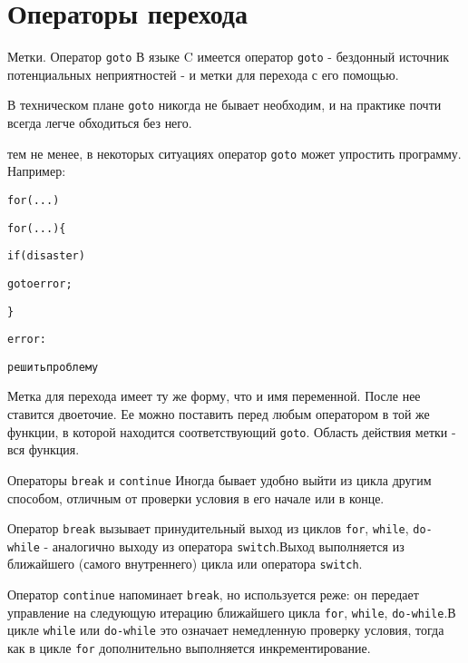 \documentclass[xcolor=table]{beamer}
\begin{document}
\section{Операторы перехода}

\begin{frame}{Метки. Оператор \texttt{goto}}
    В языке C имеется оператор \texttt{goto} - бездонный источник потенциальных неприятностей - и метки для перехода с его помощью.
    
    В техническом плане \texttt{goto} никогда не бывает необходим, и на практике почти всегда легче обходиться без него.
    
    тем не менее, в некоторых ситуациях оператор \texttt{goto} может упростить программу. Например:
    \begin{alltt}
        for ( ... )
        
        \qquad for ( ... ) \{
                
        \qquad \qquad if (disaster)
                
        \qquad \qquad \qquad goto error;
            
            \}
    
    error:
    
    \qquad решить проблему
    \end{alltt}
    Метка для перехода имеет ту же форму, что и имя переменной. После нее ставится двоеточие. Ее можно поставить перед любым оператором в той же функции, в которой находится соответствующий \texttt{goto}. Область действия метки - вся функция.
\end{frame}

\begin{frame}{Операторы \texttt{break} и \texttt{continue}}
    Иногда бывает удобно выйти из цикла другим способом, отличным от проверки условия в его начале или в конце.
    
    \medskip
    Оператор \texttt{break} вызывает принудительный выход из циклов \texttt{for}, \texttt{while}, \texttt{do-while} - аналогично выходу из оператора \texttt{switch}.Выход выполняется из ближайшего (самого внутреннего) цикла или оператора \texttt{switch}.
    
    \medskip
    Оператор \texttt{continue} напоминает \texttt{break}, но используется реже: он передает управление на следующую итерацию ближайшего цикла \texttt{for}, \texttt{while}, \texttt{do-while}.В цикле \texttt{while} или \texttt{do-while} это означает немедленную проверку условия, тогда как в цикле \texttt{for} дополнительно выполняется инкрементирование.
\end{frame}
\end{document}
